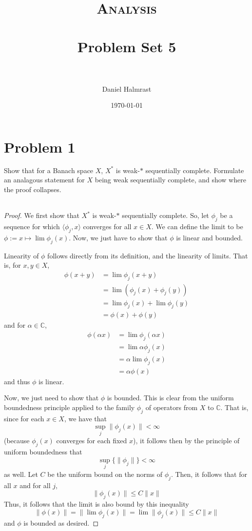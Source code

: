 \documentclass[fontsize=11pt]{scrartcl} %
\title{	
\normalfont \normalsize 
\textsc{Analysis} \\ [25pt] %
\horrule{0.5pt} \\[0.4cm] %
\huge Problem Set 5 \\ %
\horrule{2pt} \\[0.5cm] %
}
\author{Daniel Halmrast} %
\date{\normalsize\today} %
\numberwithin{equation}{section} %
\numberwithin{figure}{section} %
\numberwithin{table}{section} %
\newcommand{\C}{\mathbb{C}}
\begin{document}
\maketitle %


\section{Problem 1}
Show that for a Banach space $X$, $X^*$ is weak-$*$ sequentially complete.
Formulate an analagous statement for $X$ being weak sequentially complete, and
show where the proof collapses.
\\
\\
\begin{proof}
    We first show that $X^*$ is weak-$*$ sequentially complete. So, let $\phi_j$
    be a sequence for which $\langle \phi_j,x\rangle$ converges for all $x\in X$. We can
    define the limit to be $\phi := x\mapsto \lim \phi_j(x)$. Now, we just have
    to show that $\phi$ is linear and bounded.

    Linearity of $\phi$ follows directly from its definition, and the linearity
    of limits. That is, for $x,y\in X$,
    \[
\begin{aligned}
    \phi(x+y) &= \lim \phi_j(x+y)\\
    &= \lim (\phi_j(x) + \phi_j(y))\\
    &= \lim \phi_j(x) + \lim \phi_j(y)\\
    &= \phi(x) + \phi(y)
\end{aligned}
    \]
    and for $\alpha\in\C$,
    \[
\begin{aligned}
    \phi(\alpha x) &= \lim \phi_j(\alpha x)\\
    &= \lim \alpha\phi_j(x)\\
    &= \alpha\lim\phi_j(x)\\
    &=\alpha\phi(x)
\end{aligned}
    \]
    and thus $\phi$ is linear.

    Now, we just need to show that $\phi$ is bounded. This is clear from the
    uniform boundedness principle applied to the family $\phi_j$ of operators
    from $X$ to $\C$. That is, since for each $x\in X$, we have that
    \[
        \sup_j \|\phi_j(x)\| < \infty
    \]
    (because $\phi_j(x)$ converges for each fixed $x$), it follows then by the
    principle of uniform boundedness that
    \[
        \sup_j \{\|\phi_j\|\} < \infty
    \]
    as well. Let $C$ be the uniform bound on the norms of $\phi_j$. Then, it
    follows that for all $x$ and for all $j$,
    \[
        \|\phi_j(x)\|\leq C\|x\|
    \]
    Thus, it follows that the limit is also bound by this inequality
    \[
        \|\phi(x)\| = \|\lim\phi_j(x)\| = \lim\|\phi_j(x)\| \leq C\|x\|
    \]
    and $\phi$ is bounded as desired.


\end{proof}
\end{document}
